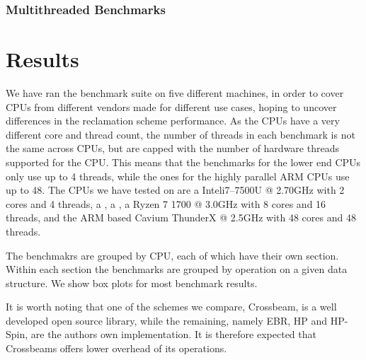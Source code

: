\documentclass[b5paper]{report}
\begin{document}
\subsection{Multithreaded Benchmarks}




\chapter{Results}\label{ch:results}

We have ran the benchmark suite on five different machines, in order to cover
CPUs from different vendors made for different use cases, hoping to uncover
differences in the reclamation scheme performance. As the CPUs have a very
different core and thread count, the number of threads in each benchmark is not
the same across CPUs, but are capped with the number of hardware threads
supported for the CPU\@. This means that the benchmarks for the lower end CPUs
only use up to 4 threads, while the ones for the highly parallel ARM CPUs use up
to 48. 
The CPUs we have tested on are a
Intel\textregistered{}i7--7500U @ 2.70GHz with 2 cores and 4 threads,
a ,
a ,
a Ryzen 7 1700 @ 3.0GHz with 8 cores and 16 threads,
and the ARM based Cavium ThunderX @ 2.5GHz with 48 cores and 48 threads.

The benchmakrs are grouped by CPU, each of which have their own section.
Within each section the benchmarks are grouped by operation on a given data
structure. We show box plots for most benchmark results.

It is worth noting that one of the schemes we compare, Crossbeam, is a well
developed open source library, while the remaining, namely EBR, HP and HP-Spin,
are the authors own implementation. It is therefore expected that Crossbeams
offers lower overhead of its operations.
\end{document}
